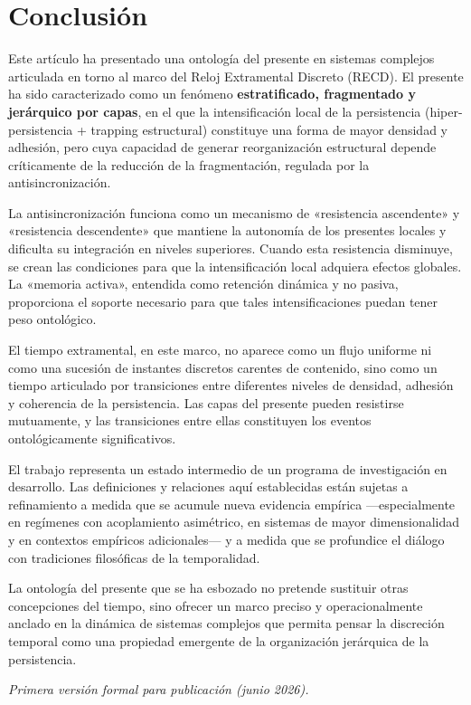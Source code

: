 \section{Conclusión}

Este artículo ha presentado una ontología del presente en sistemas complejos articulada en torno al marco del Reloj Extramental Discreto (RECD). El presente ha sido caracterizado como un fenómeno \textbf{estratificado, fragmentado y jerárquico por capas}, en el que la intensificación local de la persistencia (hiper-persistencia + trapping estructural) constituye una forma de mayor densidad y adhesión, pero cuya capacidad de generar reorganización estructural depende críticamente de la reducción de la fragmentación, regulada por la antisincronización.

La antisincronización funciona como un mecanismo de «resistencia ascendente» y «resistencia descendente» que mantiene la autonomía de los presentes locales y dificulta su integración en niveles superiores. Cuando esta resistencia disminuye, se crean las condiciones para que la intensificación local adquiera efectos globales. La «memoria activa», entendida como retención dinámica y no pasiva, proporciona el soporte necesario para que tales intensificaciones puedan tener peso ontológico.

El tiempo extramental, en este marco, no aparece como un flujo uniforme ni como una sucesión de instantes discretos carentes de contenido, sino como un tiempo articulado por transiciones entre diferentes niveles de densidad, adhesión y coherencia de la persistencia. Las capas del presente pueden resistirse mutuamente, y las transiciones entre ellas constituyen los eventos ontológicamente significativos.

El trabajo representa un estado intermedio de un programa de investigación en desarrollo. Las definiciones y relaciones aquí establecidas están sujetas a refinamiento a medida que se acumule nueva evidencia empírica —especialmente en regímenes con acoplamiento asimétrico, en sistemas de mayor dimensionalidad y en contextos empíricos adicionales— y a medida que se profundice el diálogo con tradiciones filosóficas de la temporalidad.

La ontología del presente que se ha esbozado no pretende sustituir otras concepciones del tiempo, sino ofrecer un marco preciso y operacionalmente anclado en la dinámica de sistemas complejos que permita pensar la discreción temporal como una propiedad emergente de la organización jerárquica de la persistencia. 

\vspace{1em}
\begin{center}
\textit{Primera versión formal para publicación (junio 2026).}
\end{center}